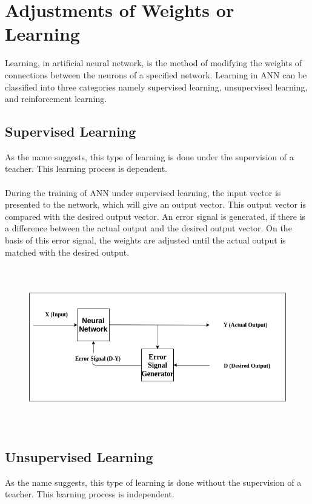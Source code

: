 \documentclass{report}
\begin{document}
\section{Adjustments of Weights or Learning}
Learning, in artificial neural network, is the method of modifying the weights of connections between the neurons of a specified network. Learning in ANN can be classified into three categories namely supervised learning, unsupervised learning, and reinforcement learning.
\subsection{Supervised Learning}

As the name suggests, this type of learning is done under the supervision of a teacher. This learning process is dependent.
\paragraph{}
During the training of ANN under supervised learning, the input vector is presented to the network, which will give an output vector. This output vector is compared with the desired output vector. An error signal is generated, if there is a difference between the actual output and the desired output vector. On the basis of this error signal, the weights are adjusted until the actual output is matched with the desired output.

\begin{figure}[htbp]
\centering
\includegraphics[height=7cm]{Pictures/Supervised Learning.png}
\caption{}
\label{}
\end{figure}

\subsection{Unsupervised Learning}
As the name suggests, this type of learning is done without the supervision of a teacher. This learning process is independent.
\end{document}
